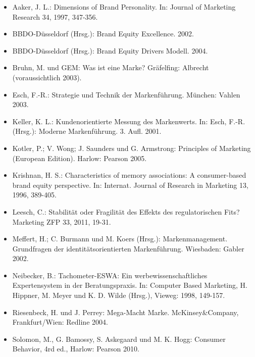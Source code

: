 \begin{course}
\begin{literature}\begin{itemize}\item Aaker, J. L.: Dimensions of Brand Personality. In: Journal of Marketing Research 34, 1997, 347-356.  \item BBDO-Düsseldorf (Hrsg.): Brand Equity Excellence. 2002.  \item BBDO-Düsseldorf (Hrsg.): Brand Equity Drivers Modell. 2004.  \item Bruhn, M. und GEM: Was ist eine Marke? Gräfelfing: Albrecht (voraussichtlich 2003).  \item Esch, F.-R.: Strategie und Technik der Markenführung. München: Vahlen 2003.  \item Keller, K. L.: Kundenorientierte Messung des Markenwerts. In: Esch, F.-R. (Hrsg.): Moderne Markenführung. 3. Aufl. 2001.  \item Kotler, P.; V. Wong; J. Saunders und G. Armstrong: Principles of Marketing (European Edition). Harlow: Pearson 2005.  \item Krishnan, H. S.: Characteristics of memory associations: A consumer-based brand equity perspective. In: Internat. Journal of Research in Marketing 13, 1996, 389-405.  \item Leesch, C.: Stabilität oder Fragilität des Effekts des regulatorischen Fits? Marketing ZFP 33, 2011, 19-31.  \item Meffert, H.; C. Burmann und M. Koers (Hrsg.): Markenmanagement. Grundfragen der identitätsorientierten Markenführung. Wiesbaden: Gabler 2002.  \item Neibecker, B.: Tachometer-ESWA: Ein werbewissenschaftliches Expertensystem in der Beratungspraxis. In: Computer Based Marketing, H. Hippner, M. Meyer und K. D. Wilde (Hrsg.), Vieweg: 1998, 149-157.  \item Riesenbeck, H. und J. Perrey: Mega-Macht Marke. McKinsey\&Company, Frankfurt/Wien: Redline 2004.  \item Solomon, M., G. Bamossy, S. Askegaard und M. K. Hogg: Consumer Behavior, 4rd ed., Harlow: Pearson 2010.  \end{itemize}\end{literature}



\end{course}